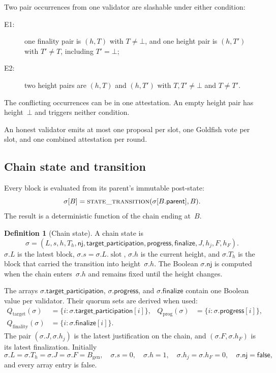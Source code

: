 \documentclass{article}
\theoremstyle{plain}
\theoremstyle{definition}
\newtheorem{definition}{Definition}
\theoremstyle{remark}
\newcommand{\genesis}{B_{\mathrm{gen}}}
\newcommand{\slot}{\operatorname{slot}}
\newcommand{\parent}{\mathsf{parent}}
\newcommand{\targetParticipation}{\mathsf{target\_participation}}
\newcommand{\progressBit}{\mathsf{progress}}
\newcommand{\finalityBit}{\mathsf{finalize}}
\newcommand{\Qtarget}{Q_{\mathrm{target}}}
\newcommand{\Qprog}{Q_{\mathrm{prog}}}
\newcommand{\Qfin}{Q_{\mathrm{finality}}}
\newcommand{\nj}{\mathsf{nj}}
\begin{document}
Two pair occurrences from one validator are slashable under either
condition:
\begin{description}
 \item[E1:] one finality pair is $(h,T)$ with $T\neq\bot$, and one height
   pair is $(h,T')$ with $T'\neq T$, including $T'=\bot$;
 \item[E2:] two height pairs are $(h,T)$ and $(h,T')$ with
   $T,T'\neq\bot$ and $T\neq T'$.
\end{description}
The conflicting occurrences can be in one attestation.  An empty height pair
has height~$\bot$ and triggers neither condition.

An honest validator emits at most one proposal per slot, one Goldfish vote
per slot, and one combined attestation per round.

\subsection{Chain state and transition}

Every block is evaluated from its parent's immutable post-state:
\[
 \sigma[B]=\Call{state\_transition}{\sigma[B.\parent],B}.
\]
The result is a deterministic function of the chain ending at~$B$.

\begin{definition}[Chain state]\label{def:chain-state}
A chain state is
\[
 \sigma=(L,s,h,T_h,\nj,
  \targetParticipation,\progressBit,\finalityBit,
  J,h_j,F,h_F).
\]
$\sigma.L$ is the latest block, $\sigma.s=\sigma.L.\slot$, $\sigma.h$ is the
current height, and $\sigma.T_h$ is the block that carried the transition
into height~$\sigma.h$.  The Boolean $\sigma.\nj$ is computed when the chain
enters~$\sigma.h$ and remains fixed until the height
changes.

The arrays $\sigma.\targetParticipation$, $\sigma.\progressBit$, and
$\sigma.\finalityBit$ contain
one Boolean value per validator.  Their quorum sets are derived when used:
\[
 \begin{aligned}
  \Qtarget(\sigma)&=\{i:\sigma.\targetParticipation[i]\},&
  \Qprog(\sigma)&=\{i:\sigma.\progressBit[i]\},\\
  \Qfin(\sigma)&=\{i:\sigma.\finalityBit[i]\}.&&
 \end{aligned}
\]
The pair $(\sigma.J,\sigma.h_j)$ is the latest justification on the chain,
and $(\sigma.F,\sigma.h_F)$ is its latest finalization.  Initially
\[
 \sigma.L=\sigma.T_h=\sigma.J=\sigma.F=\genesis,\quad
 \sigma.s=0,\quad \sigma.h=1,\quad \sigma.h_j=\sigma.h_F=0,
 \quad\sigma.\nj=\mathsf{false},
\]
and every array entry is false.
\end{definition}
\end{document}
